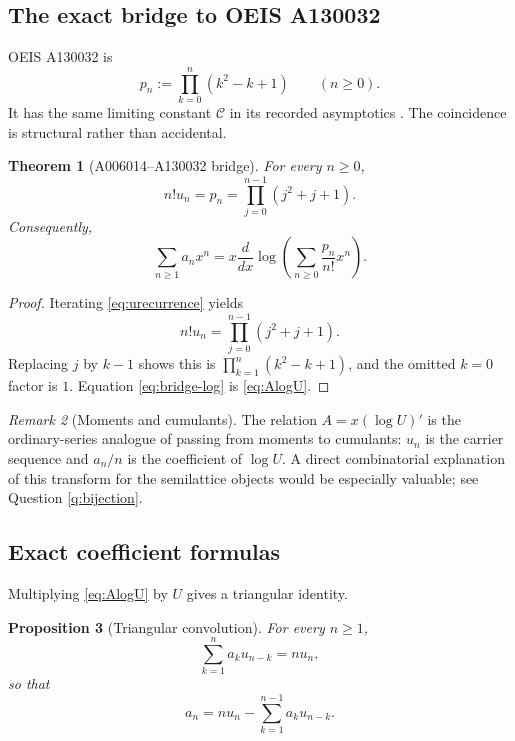 \documentclass[11pt,a4paper]{article}
\newtheorem{theorem}{Theorem}[section]
\newtheorem{proposition}[theorem]{Proposition}
\theoremstyle{definition}
\theoremstyle{remark}
\newtheorem{remark}[theorem]{Remark}
\newcommand{\constC}{\mathcal{C}}
\begin{document}
\subsection{The exact bridge to OEIS A130032}

OEIS A130032 is
\begin{equation}\label{eq:A130032}
 p_n:=\prod_{k=0}^{n}(k^2-k+1)
 \qquad(n\ge0).
\end{equation}
It has the same limiting constant \(\constC\) in its recorded asymptotics \cite{OEISA130032}.  The coincidence is structural rather than accidental.

\begin{theorem}[A006014--A130032 bridge]\label{thm:bridge}
For every \(n\ge0\),
\begin{equation}\label{eq:bridge}
 n!u_n=p_n=\prod_{j=0}^{n-1}(j^2+j+1).
\end{equation}
Consequently,
\begin{equation}\label{eq:bridge-log}
 \sum_{n\ge1}a_nx^n
 =x\frac{d}{dx}\log\left(
   \sum_{n\ge0}\frac{p_n}{n!}x^n\right).
\end{equation}
\end{theorem}

\begin{proof}
Iterating \eqref{eq:urecurrence} yields
\[
 n!u_n=\prod_{j=0}^{n-1}(j^2+j+1).
\]
Replacing \(j\) by \(k-1\) shows this is \(\prod_{k=1}^{n}(k^2-k+1)\), and the omitted \(k=0\) factor is \(1\).  Equation \eqref{eq:bridge-log} is \eqref{eq:AlogU}.
\end{proof}

\begin{remark}[Moments and cumulants]
The relation \(A=x(\log U)'\) is the ordinary-series analogue of passing from moments to cumulants: \(u_n\) is the carrier sequence and \(a_n/n\) is the coefficient of \(\log U\).  A direct combinatorial explanation of this transform for the semilattice objects would be especially valuable; see Question \ref{q:bijection}.
\end{remark}

\subsection{Exact coefficient formulas}

Multiplying \eqref{eq:AlogU} by \(U\) gives a triangular identity.

\begin{proposition}[Triangular convolution]\label{prop:triangular}
For every \(n\ge1\),
\begin{equation}\label{eq:triangular}
 \sum_{k=1}^{n}a_k u_{n-k}=n u_n,
\end{equation}
so that
\begin{equation}\label{eq:triangular-rec}
 a_n=n u_n-\sum_{k=1}^{n-1}a_k u_{n-k}.
\end{equation}
\end{proposition}
\end{document}
